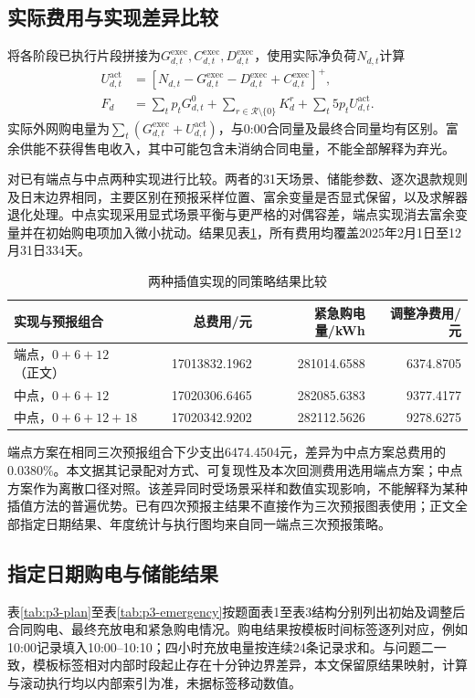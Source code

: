 \subsection{实际费用与实现差异比较}
将各阶段已执行片段拼接为$G^{\mathrm{exec}}_{d,t},C^{\mathrm{exec}}_{d,t},D^{\mathrm{exec}}_{d,t}$，使用实际净负荷$N_{d,t}$计算
\begin{align}
U^{\mathrm{act}}_{d,t}&=[N_{d,t}-G^{\mathrm{exec}}_{d,t}-D^{\mathrm{exec}}_{d,t}+C^{\mathrm{exec}}_{d,t}]^+,\\
F_d&=\sum_tp_tG^0_{d,t}+\sum_{r\in\mathcal R\setminus\{0\}}K_d^r
+\sum_t5p_tU^{\mathrm{act}}_{d,t}.\label{eq:p3-total}
\end{align}
实际外网购电量为$\sum_t(G^{\mathrm{exec}}_{d,t}+U^{\mathrm{act}}_{d,t})$，与0:00合同量及最终合同量均有区别。富余供能不获得售电收入，其中可能包含未消纳合同电量，不能全部解释为弃光。

对已有端点与中点两种实现进行比较。两者的31天场景、储能参数、逐次退款规则及日末边界相同，主要区别在预报采样位置、富余变量是否显式保留，以及求解器退化处理。中点实现采用显式场景平衡与更严格的对偶容差，端点实现消去富余变量并在初始购电项加入微小扰动。结果见表\ref{tab:p3-versions}，所有费用均覆盖2025年2月1日至12月31日334天。
\begin{table}[htbp]\centering
\caption{两种插值实现的同策略结果比较}\label{tab:p3-versions}
\small\begin{tabular}{lrrr}\toprule
实现与预报组合 & 总费用/元 & 紧急购电量/kWh & 调整净费用/元\\\midrule
端点，$0+6+12$（正文）&17013832.1962&281014.6588&6374.8705\\
中点，$0+6+12$ &17020306.6465&282085.6383&9377.4177\\
中点，$0+6+12+18$ &17020342.9202&282112.5626&9278.6275\\\bottomrule
\end{tabular}\end{table}
端点方案在相同三次预报组合下少支出6474.4504元，差异为中点方案总费用的0.0380\%。本文据其记录配对方式、可复现性及本次回测费用选用端点方案；中点方案作为离散口径对照。该差异同时受场景采样和数值实现影响，不能解释为某种插值方法的普遍优势。已有四次预报主结果不直接作为三次预报图表使用；正文全部指定日期结果、年度统计与执行图均来自同一端点三次预报策略。

\subsection{指定日期购电与储能结果}
表\ref{tab:p3-plan}至表\ref{tab:p3-emergency}按题面表1至表3结构分别列出初始及调整后合同购电、最终充放电和紧急购电情况。购电结果按模板时间标签逐列对应，例如10:00记录填入10:00--10:10；四小时充放电量按连续24条记录求和。与问题二一致，模板标签相对内部时段起止存在十分钟边界差异，本文保留原结果映射，计算与滚动执行均以内部索引为准，未据标签移动数值。

